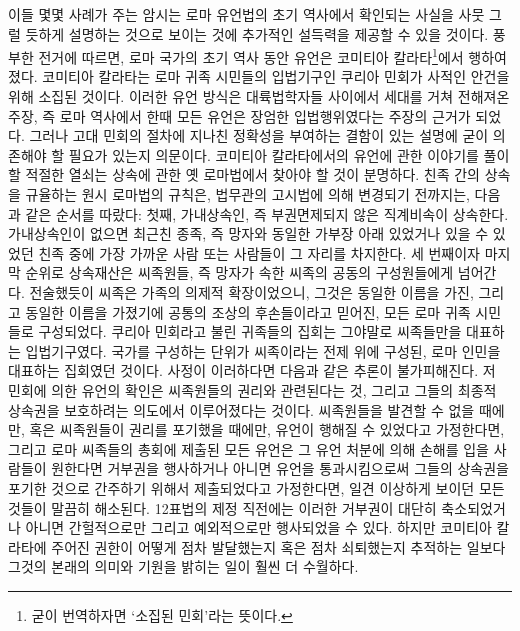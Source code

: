 이들 몇몇 사례가 주는 암시는
로마 유언법의 초기 역사에서 확인되는 사실을 사뭇 그럴 듯하게 설명하는 것으로
보이는 것에 추가적인 설득력을 제공할 수 있을 것이다.
풍부한 전거에 따르면,
로마 국가의 초기 역사 동안 유언은
코미티아 칼라타\footnote{굳이 번역하자면
`소집된 민회'라는 뜻이다.}에서 행하여졌다.
코미티아 칼라타는 로마 귀족 시민들의 입법기구인
쿠리아 민회가 사적인 안건을 위해 소집된 것이다.
이러한 유언 방식은 대륙법학자들 사이에서 세대를 거쳐 전해져온 주장,
즉 로마 역사에서 한때 모든 유언은 장엄한 입법행위였다는 주장의
근거가 되었다.
그러나 고대 민회의 절차에 지나친 정확성을 부여하는 결함이 있는
설명에 굳이 의존해야 할 필요가 있는지 의문이다.
코미티아 칼라타에서의 유언에 관한 이야기를 풀이할 적절한 열쇠는
상속에 관한 옛 로마법에서 찾아야 할 것이 분명하다.
친족 간의 상속을 규율하는 원시 로마법의 규칙은,
법무관의 고시법에 의해 변경되기 전까지는,
다음과 같은 순서를 따랐다:
첫째, 가내상속인, 즉 부권면제되지 않은
직계비속이 상속한다.
가내상속인이 없으면 최근친 종족,
즉 망자와 동일한 가부장 아래 있었거나 있을 수 있었던 친족 중에
가장 가까운 사람 또는 사람들이
그 자리를 차지한다.
세 번째이자 마지막 순위로 상속재산은 씨족원들, 즉
망자가 속한 씨족의 공동의 구성원들에게 넘어간다.
전술했듯이 씨족은 가족의 의제적 확장이었으니, 그것은
동일한 이름을 가진,
그리고 동일한 이름을 가졌기에 공통의 조상의 후손들이라고 믿어진,
모든 로마 귀족 시민들로 구성되었다.
쿠리아 민회라고 불린 귀족들의 집회는 그야말로 씨족들만을 대표하는 입법기구였다.
국가를 구성하는 단위가 씨족이라는 전제 위에 구성된,
로마 인민을 대표하는 집회였던 것이다.
사정이 이러하다면 다음과 같은 추론이 불가피해진다.
저 민회에 의한 유언의 확인은 씨족원들의 권리와 관련된다는 것,
그리고 그들의 최종적 상속권을 보호하려는 의도에서 이루어졌다는 것이다.
씨족원들을 발견할 수 없을 때에만,
혹은 씨족원들이 권리를 포기했을 때에만,
유언이 행해질 수 있었다고 가정한다면,
그리고 로마 씨족들의 총회에 제출된 모든 유언은
그 유언 처분에 의해 손해를 입을 사람들이 원한다면 거부권을 행사하거나
아니면 유언을 통과시킴으로써 그들의 상속권을 포기한 것으로 간주하기 위해서
제출되었다고 가정한다면,
일견 이상하게 보이던 모든 것들이 말끔히 해소된다.
12표법의 제정 직전에는 이러한 거부권이 대단히 축소되었거나
아니면 간헐적으로만 그리고 예외적으로만
행사되었을 수 있다.
하지만 코미티아 칼라타에 주어진 권한이 어떻게 점차 발달했는지 혹은
점차 쇠퇴했는지 추적하는 일보다 그것의 본래의 의미와 기원을 밝히는 일이
훨씬 더 수월하다.

